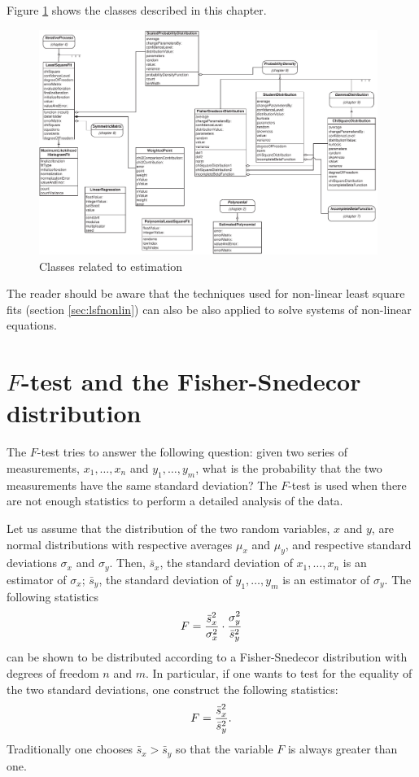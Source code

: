 Figure \ref{fig:estimationclasses} shows the classes described in
this chapter.
\begin{figure}
\centering\includegraphics[width=11cm]{Figures/EstimationClasses}
\caption{Classes related to estimation}
\label{fig:estimationclasses}
\end{figure}
The reader should be aware that the techniques used for non-linear
least square fits (section \ref{sec:lsfnonlin}) can also be also
applied to solve systems of non-linear equations.

\section{$F$-test and the Fisher-Snedecor distribution}
\label{sec:Ftest} The $F$-test tries to answer the following
question: given two series of measurements, $x_1,\ldots,x_n$ and
$y_1,\ldots,y_m$, what is the probability that the two
measurements have the same standard deviation? The $F$-test is
used when there are not enough statistics to perform a detailed
analysis of the data.

Let us assume that the distribution of the two random variables,
$x$ and $y$, are normal distributions with respective averages
$\mu_x$ and $\mu_y$, and respective standard deviations $\sigma_x$
and $\sigma_y$. Then, $\bar{s}_x$, the standard deviation of
$x_1,\ldots,x_n$ is an estimator of $\sigma_x$; $\bar{s}_y$, the
standard deviation of $y_1,\ldots,y_m$ is an estimator of
$\sigma_y$. The following statistics
\begin{equation}
  F={\displaystyle \bar{s}_x^2\over\sigma_x^2}\cdot{\displaystyle\sigma_y^2\over\bar{s}_y^2}
\end{equation}
can be shown to be distributed according to a Fisher-Snedecor
distribution with degrees of freedom $n$ and $m$. In particular,
if one wants to test for the equality of the two standard
deviations, one construct the following statistics:
\begin{equation}
\label{eq:Ftest}
  F={\displaystyle \bar{s}_x^2\over\bar{s}_y^2}.
\end{equation}
Traditionally one chooses $\bar{s}_x>\bar{s}_y$ so that the
variable $F$ is always greater than one.

